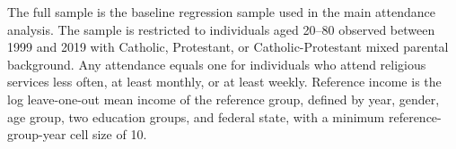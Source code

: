 \begin{table}[!htbp]
\begin{minipage}{1.00\textwidth}
The full sample is the baseline regression sample used in the main attendance analysis. 
The sample is restricted to individuals aged 20--80 observed between 1999 and 2019 with Catholic, Protestant, or Catholic-Protestant mixed parental background. 
Any attendance equals one for individuals who attend religious services less often, at least monthly, or at least weekly. 
Reference income is the log leave-one-out mean income of the reference group, defined by year, gender, age group, two education groups, and federal state, with a minimum reference-group-year cell size of 10. 
\end{minipage}
\endgroup
\end{table}
